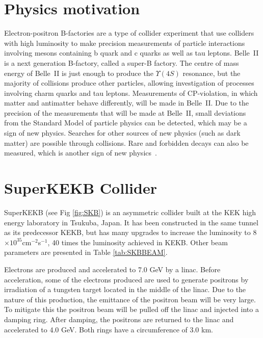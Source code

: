 \section{Physics motivation}

	Electron-positron B-factories are a type of collider experiment that use \epem colliders with high luminosity to make precision measurements of particle interactions involving mesons containing b quark and c quarks as well as tau leptons. Belle~II is a next generation \epem B-factory, called a super-B factory. The centre of mass energy of Belle~II is just enough to produce the $\Upsilon(4S)$ resonance, but the majority of collisions produce other particles, allowing investigation of processes involving charm quarks and tau leptons. Measurements of CP-violation, in which matter and antimatter behave differently, will be made in Belle~II. Due to the precision of the measurements that will be made at Belle~II, small deviations from the Standard Model of particle physics can be detected, which may be a sign of new physics. Searches for other sources of new physics (such as dark matter) are possible through \epem collisions. Rare and forbidden decays can also be measured, which is another sign of new physics~\cite{GrantProp}.


\section{SuperKEKB Collider}
\label{sec:SKB}




SuperKEKB (see Fig \ref{fig:SKB}) is an asymmetric \epem collider built at the KEK high energy laboratory in Tsukuba, Japan. It has been constructed in the same tunnel as its predecessor KEKB, but has many upgrades to increase the luminosity to 8$\times10^{35}$cm$^{-2}$s$^{-1}$, 40 times the luminosity achieved in KEKB. Other beam parameters are presented in Table \ref{tab:SKBBEAM}.

Electrons are produced and accelerated to 7.0 GeV by a linac. Before acceleration, some of the electrons produced are used to generate positrons by irradiation of a tungsten target located in the middle of the linac. Due to the nature of this production, the emittance of the positron beam will be very large. To mitigate this the positron beam will be pulled off the linac and injected into a damping ring. After damping, the positrons are returned to the linac and accelerated to 4.0 GeV. Both rings have a circumference of 3.0 km.

